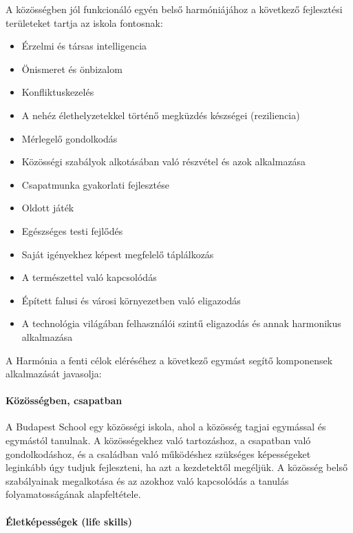A közösségben jól funkcionáló egyén belső harmóniájához a következő
fejlesztési területeket tartja az iskola fontosnak:

\begin{itemize}
\tightlist
\item
  Érzelmi és társas intelligencia
\item
  Önismeret és önbizalom
\item
  Konfliktuskezelés
\item
  A nehéz élethelyzetekkel történő megküzdés készségei (reziliencia)
\item
  Mérlegelő gondolkodás
\item
  Közösségi szabályok alkotásában való részvétel és azok alkalmazása
\item
  Csapatmunka gyakorlati fejlesztése
\item
  Oldott játék
\item
  Egészséges testi fejlődés
\item
  Saját igényekhez képest megfelelő táplálkozás
\item
  A természettel való kapcsolódás
\item
  Épített falusi és városi környezetben való eligazodás
\item
  A technológia világában felhasználói szintű eligazodás és annak\break
  harmonikus alkalmazása
\end{itemize}

A Harmónia a fenti célok eléréséhez a következő egymást segítő
komponensek alkalmazását javasolja:

\vspace*{-1ex}
\hypertarget{kozossegben-csapatban}{%
\paragraph{Közösségben, csapatban}\label{kozossegben-csapatban}}

A Budapest School egy közösségi iskola, ahol a közösség tagjai egymással
és egymástól tanulnak. A közösségekhez való tartozáshoz, a csapatban
való gondolkodáshoz, és a családban való működéshez szükséges
képességeket leginkább úgy tudjuk fejleszteni, ha azt a kezdetektől
megéljük. A közösség belső szabályainak megalkotása és az azokhoz való
kapcsolódás a tanulás folyamatosságának alapfeltétele.

\vspace*{-1ex}
\hypertarget{eletkepessegek-life-skills}{%
\paragraph{Életképességek (life
skills)}\label{eletkepessegek-life-skills}}


